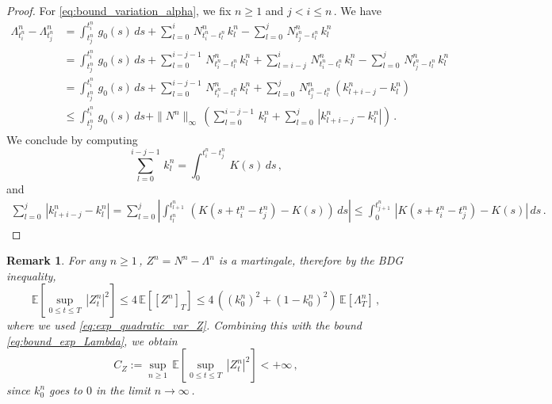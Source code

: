 \documentclass{article}
\newcommand{\1}{\mathbbm{1}}
\newtheorem{remark}[theorem]{Remark}
\numberwithin{equation}{section}
\begin{document}
\begin{proof}
    For \eqref{eq:bound_variation_alpha}, we fix $n \geq 1$ and $j < i \leq n\,$. We have 
    \begin{align*}
        \Lambda^n_{t^n_i} - \Lambda^n_{t^n_j} &= \int_{t^n_j}^{t^n_i}\,g_0(s)\,ds + \sum_{l = 0}^i\,N^n_{t^n_i - t^n_l}\,k^n_l - \sum_{l = 0}^j\,N^n_{t^n_j - t^n_l}\,k^n_l \\
        &= \int_{t^n_j}^{t^n_i}\,g_0(s)\,ds + \sum_{l = 0}^{i -j -1}\,N^n_{t^n_i - t^n_l}\,k^n_l + \sum_{l = i-j}^i\,N^n_{t^n_i - t^n_l}\,k^n_l - \sum_{l = 0}^j \,N^n_{t^n_j - t^n_l}\,k^n_l\\
        &= \int_{t^n_j}^{t^n_i}\,g_0(s)\,ds + \sum_{l = 0}^{i - j - 1}\,N^n_{t^n_i - t^n_l}\,k^n_l + \sum_{l = 0}^j\,N^n_{t^n_j - t^n_l}\,\left(k^n_{l + i -j} - k^n_l\right) \\
        &\leq \int_{t^n_j}^{t^n_i}\,g_0(s)\,ds + \|N^n\|_{\infty}\, \left(\sum_{l = 0}^{i-j-1}\,k^n_l + \sum_{l = 0}^j\,\left| k^n_{l + i - j} - k^n_l\right|\right)\,.
    \end{align*}
    We conclude by computing
    $$
    \sum_{l = 0}^{i - j-1}\,k^n_l = \int_0^{t^n_i - t^n_j}\,K(s)\,ds\,,
    $$
    and
    \begin{align*}
        \sum_{l = 0}^j\,\left| k^n_{l + i - j} - k^n_l\right| = \sum_{l = 0}^{j}\left|\int_{t^n_l}^{t^n_{l+1}}\,\left(K(s + t^n_i - t^n_j) - K(s) \right)\,ds \right|
        \leq \int_0^{t^n_{j+1}}\, \left|K(s + t^n_i - t^n_j) - K(s) \right|\,ds\,.
    \end{align*}
\end{proof}

\begin{remark}
\label{remark:additional_bound}
For any $n \geq 1\,$, $Z^n = N^n - \Lambda^n$ is a martingale, therefore by the BDG inequality,
$$
\mathbb E \left[\sup_{0 \leq t \leq T}\,\left|Z^n_t\right|^2\right] \leq 4\,\mathbb E \left[\left[Z^n\right]_T\right] \leq 4\,\left(\left(k_0^n\right)^2 + \left(1-k_0^n\right)^2\right)\, \mathbb E \left[\Lambda^n_T\right]\,,
$$
where we used \eqref{eq:exp_quadratic_var_Z}. Combining this with the bound \eqref{eq:bound_exp_Lambda}, we obtain
\begin{equation}
\label{eq:bound_exp_Z}
    C_Z := \sup_{n \geq 1}\, \mathbb E \left[ \sup_{0 \leq t \leq T}\, \left|Z^n_t\right|^2\right] < + \infty\,,
\end{equation}
since $k_0^n$ goes to $0$ in the limit $n \to \infty\,$.
\end{remark}
\end{document}

